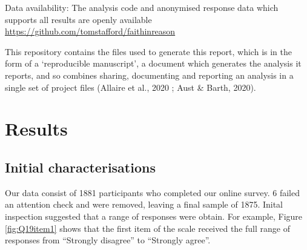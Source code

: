 \documentclass[
  ,jou,floatsintext]{apa6}
\begin{document}
Data availability: The analysis code and anonymised response data which supports all results are openly available \url{https://github.com/tomstafford/faithinreason}

This repository contains the files used to generate this report, which is in the form of a `reproducible manuscript', a document which generates the analysis it reports, and so combines sharing, documenting and reporting an analysis in a single set of project files (Allaire et al., 2020 ; Aust \& Barth, 2020).

\hypertarget{results}{%
\section{Results}\label{results}}

\hypertarget{initial-characterisations}{%
\subsection{Initial characterisations}\label{initial-characterisations}}

Our data consist of 1881 participants who completed our online survey. 6 failed an attention check and were removed, leaving a final sample of 1875. Inital inspection suggested that a range of responses were obtain. For example, Figure \ref{fig:Q19item1} shows that the first item of the scale received the full range of responses from ``Strongly disagree'' to ``Strongly agree''.
\end{document}
